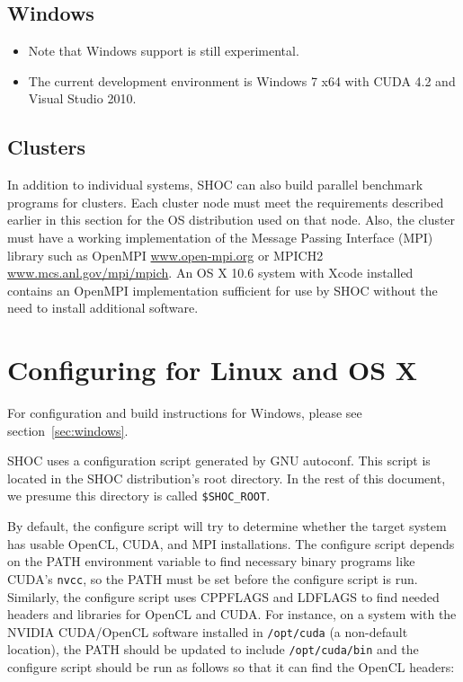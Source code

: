 \documentclass[11pt]{article}
\begin{document}
\subsection{Windows}

\begin{itemize}
\item Note that Windows support is still experimental.
\item The current development environment is Windows 7 x64 with CUDA 4.2 and Visual Studio 2010.
\end{itemize}


\subsection{Clusters}
In addition to individual systems, SHOC can also build parallel benchmark
programs for clusters. Each cluster node must meet the requirements described
earlier in this section for the OS distribution used on that node.
Also, the cluster must have a working implementation of the 
Message Passing Interface 
(MPI)\,\cite{gropp-lusk-skjellum:using-mpi2nd,gropp-lusk-thakur:usingmpi2}
library such as OpenMPI \url{www.open-mpi.org} or MPICH2 
\url{www.mcs.anl.gov/mpi/mpich}.
An OS X 10.6 system with Xcode installed contains an OpenMPI implementation
sufficient for use by SHOC without the need to install additional software.


\section{Configuring for Linux and OS X}\label{sec:configuring}

For configuration and build instructions for Windows,
please see section~\ref{sec:windows}.

SHOC uses a configuration script generated by GNU autoconf.  
This script is located in the SHOC distribution's root directory.
In the rest of this document, we presume this directory is called 
\verb+$SHOC_ROOT+.

By default, the configure script will try to determine whether the 
target system has usable OpenCL, CUDA, and MPI installations.  
The configure script depends on the PATH environment variable to find necessary
binary programs like CUDA's \verb+nvcc+, so the PATH must be set before the
configure script is run.
Similarly, the configure script uses CPPFLAGS and LDFLAGS to find needed
headers and libraries for OpenCL and CUDA.
For instance, on a system with the NVIDIA CUDA/OpenCL software installed
in \verb+/opt/cuda+ (a non-default location), the PATH should be updated to include
\verb+/opt/cuda/bin+ and the configure script should be run as follows so that it can
find the OpenCL headers:
\end{document}
